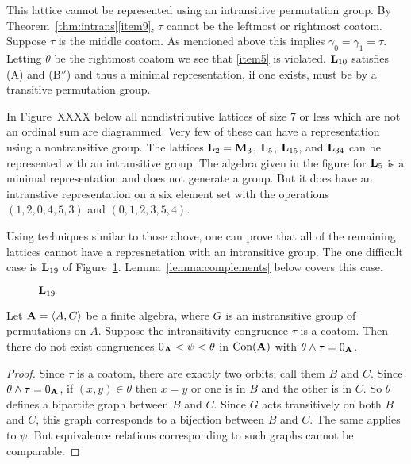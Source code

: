 This lattice cannot be represented using an intransitive permutation group. 
By Theorem~\ref{thm:intrans}\eqref{item9}, $\tau$ cannot be the leftmost or rightmost
coatom. Suppose $\tau$ is the middle coatom.  
As mentioned above this implies
$\gamma_0 = \gamma_1 = \tau$. Letting $\theta$ be the rightmost coatom we 
see that \eqref{item5} is violated. 
$\bL_{10}$ satisfies (A) and (B$''$) and thus a minimal representation, if one 
exists, must be by a transitive permutation group.

In Figure~XXXX below all nondistributive lattices
of size 7 or less which are not an ordinal sum are diagrammed. 
Very few of these can have a representation using a nontransitive
group. The lattices $\bL_2 = \bM_3$, $\bL_5$, $\bL_{15}$, 
and $\bL_{34}$ can be represented with an intransitive group. 
The algebra given in the figure for $\bL_5$ is a minimal 
representation and does not generate a group. But it does 
have an intranstive representation on a six element set with
the operations $(1,2,0,4,5,3)$ and $(0,1,2,3,5,4)$. 

Using techniques similar to those above, one
can prove that all of the remaining lattices cannot
have a represnetation with an intransitive group.
The one difficult case is $\bL_{19}$ of Figure~\ref{fig:L19}.
Lemma~\ref{lemma:complements} below covers this case.

\begin{figure}[htb]
\begin{center}
  \begin{tikzpicture}[scale=1]
    
  \end{tikzpicture}
\end{center}
\caption{$\bL_{19}$}\label{fig:L19}
\end{figure}

\begin{lemma}\label{lemma:complements}
Let $\bA = \<A,G\>$ be a finite algebra, where
$G$ is an instransitive group of permutations on $A$.
Suppose the intransitivity congruence $\tau$ is a coatom.
Then there do not exist congruences
$0_\bA < \psi < \theta$ in $\Con(\bA)$
with $\theta \meet \tau = 0_\bA$. 
\end{lemma}

\begin{proof}
Since $\tau$ is a coatom, there are exactly two orbits; call
them $B$ and $C$. Since $\theta \meet \tau = 0_\bA$, if
$(x,y) \in \theta$ then $x=y$ or one is in $B$ and the other
is in $C$. So $\theta$ defines a bipartite graph between
$B$ and $C$. Since $G$ acts transitively on both $B$ and $C$,
this graph corresponds to a bijection between $B$ and $C$. 
The same applies to $\psi$. But equivalence relations
corresponding to such graphs cannot be comparable.
\end{proof}




